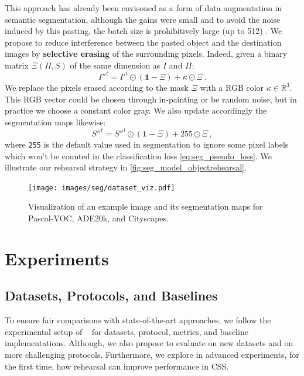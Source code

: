 This approach has already been envisoned as a form of data augmentation in semantic segmentation,
although the gains were small and to avoid the noise induced by this pasting, the batch size is
prohibitively large (up to 512) \cite{ghiasi2020simplecopypaste}. We propose to reduce interference
between the pasted object and the destination images by \textbf{selective erasing} of the
surrounding pixels. Indeed, given a binary matrix $\Xi(\Pi, S)$ of the same dimension as $I$ and
$\Pi$:
%
\begin{equation}
    {I''}^t = {I'}^t \odot (\mathbf{1} - \Xi) + \kappa \odot \Xi\,.
    \label{eq:seg_erasing_pixel}
\end{equation}
%
We replace the pixels erased according to the mask $\Xi$ with a RGB color $\kappa \in \mathbb{R}^3$.
This RGB vector could be chosen through in-painting \cite{fang2019instaboost} or be random noise,
but in practice we choose a constant color gray. We also update accordingly the segmentation maps
likewise:
%
\begin{equation}
    {S''}^t = {S''}^t \odot (\mathbf{1} - \Xi) + 255 \odot \Xi\,,
    \label{eq:seg_erasing_label}
\end{equation}
%
where \texttt{255} is the default value used in segmentation to ignore some pixel labels which won't
be counted in the classification loss \autoref{eq:seg_pseudo_loss}. We illustrate our rehearsal
strategy in \autoref{fig:seg_model_objectrehearsal}.



\begin{figure}
    \centering
    \texttt{[image: images/seg/dataset\_viz.pdf]}
    \vspace*{-0.3cm}
    \caption{Visualization of an example image and its segmentation maps for Pascal-VOC, ADE20k, and Cityscapes.}
    \label{fig:seg_dataset_viz}
\end{figure}



\section{Experiments}
\label{sec:seg_exp}

\subsection{Datasets, Protocols, and Baselines}
\label{sec:seg_datasets_protocols}

To ensure fair comparisons with state-of-the-art approaches, we follow the experimental setup of
~\cite{cermelli2020modelingthebackground} for datasets, protocol, metrics, and baseline
implementations. Although, we also propose to evaluate on new datasets and on more challenging
protocols. Furthermore, we explore in advanced experiments, for the first time, how rehearsal can
improve performance in \ac{CSS}.

